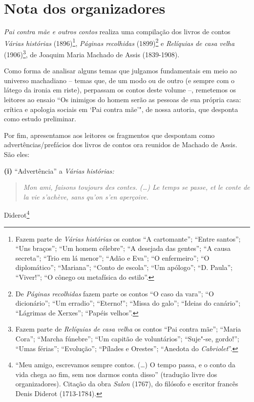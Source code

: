 
\chapter{Nota dos organizadores}

\emph{Pai contra mãe e outros contos} realiza uma compilação dos livros
de contos \emph{Várias histórias} (1896)\footnote{Fazem parte de
  \emph{Várias histórias} os contos ``A cartomante''; ``Entre santos'';
  ``Uns braços''; ``Um homem célebre''; ``A desejada das gentes''; ``A
  causa secreta''; ``Trio em lá menor''; ``Adão e Eva''; ``O
  enfermeiro''; ``O diplomático''; ``Mariana''; ``Conto de escola'';
  ``Um apólogo''; ``D. Paula''; ``Viver!''; ``O cônego ou metafísica do
  estilo''.}, \emph{Páginas recolhidas} (1899)\footnote{De \emph{Páginas
  recolhidas} fazem parte os contos ``O caso da vara''; ``O
  dicionário''; ``Um erradio''; ``Eterno!''; ``Missa do galo''; ``Ideias
  do canário''; ``Lágrimas de Xerxes''; ``Papéis velhos''.} e
\emph{Relíquias de casa velha} (1906)\footnote{Fazem parte de
  \emph{Relíquias de casa velha} os contos ``Pai contra mãe''; ``Maria
  Cora''; ``Marcha fúnebre''; ``Um capitão de voluntários''; ``Suje"-se,
  gordo!''; ``Umas férias''; ``Evolução''; ``Pílades e Orestes'';
  ``Anedota do \emph{Cabriolet}''.}, de Joaquim Maria Machado de Assis
(1839-1908).

Como forma de analisar alguns temas que julgamos fundamentais em meio ao
universo machadiano -- temas que, de um modo ou de outro (e sempre com o
látego da ironia em riste), perpassam os contos deste volume --,
remetemos os leitores ao ensaio ``Os inimigos do homem serão as pessoas
de sua própria casa: crítica e apologia sociais em `Pai contra mãe'",
de nossa autoria, que desponta como estudo preliminar.

Por fim, apresentamos aos leitores os fragmentos que despontam como
advertências/prefácios dos livros de contos ora reunidos de Machado de
Assis. São eles:

\pagebreak

\textbf{(i)} ``Advertência'' a \emph{Várias histórias: }
\begin{quote}
\emph{Mon ami, faisons toujours des contes. (\ldots{}) Le temps se passe, et
le conte de la vie s'achève, sans qu'on s'en aperçoive. }
\end{quote}

\begin{flushright}
Diderot\footnote{``Meu amigo, escrevamos sempre contos. (\ldots{}) O tempo
  passa, e o conto da vida chega ao fim, sem nos darmos conta disso''
  (tradução livre dos organizadores). Citação da obra \emph{Salon}
  (1767), do filósofo e escritor francês Denis Diderot (1713-1784).}
 \end{flushright}

